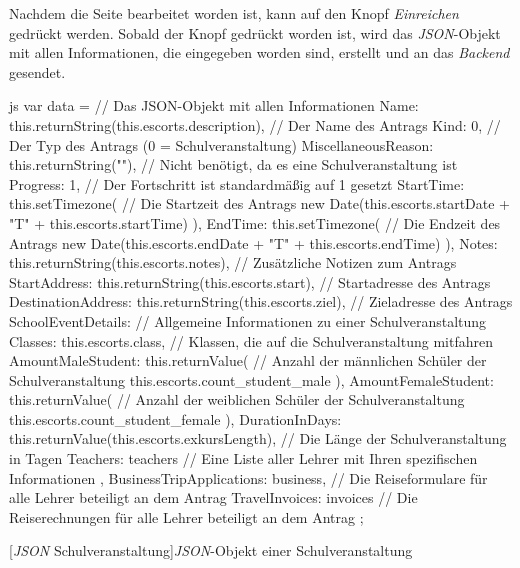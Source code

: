 \newpage
Nachdem die Seite bearbeitet worden ist, kann auf den Knopf \textit{Einreichen} gedrückt werden. Sobald der Knopf gedrückt worden ist, wird das \textit{JSON}-Objekt mit allen Informationen, die eingegeben worden sind, erstellt und an das \textit{Backend} gesendet.
\begin{code}{js}
var data = {		// Das JSON-Objekt mit allen Informationen
	Name: this.returnString(this.escorts.description),	// Der Name des Antrags
	Kind: 0,	// Der Typ des Antrags (0 = Schulveranstaltung)
	MiscellaneousReason: this.returnString(""),			// Nicht benötigt, da es eine Schulveranstaltung ist
	Progress: 1,	// Der Fortschritt ist standardmäßig auf 1 gesetzt
	StartTime: this.setTimezone(	// Die Startzeit des Antrags
	new Date(this.escorts.startDate + "T" + this.escorts.startTime)
	),
	EndTime: this.setTimezone(	// Die Endzeit des Antrags
	new Date(this.escorts.endDate + "T" + this.escorts.endTime)
	),
	Notes: this.returnString(this.escorts.notes),	// Zusätzliche Notizen zum Antrags
	StartAddress: this.returnString(this.escorts.start),	// Startadresse des Antrags
	DestinationAddress: this.returnString(this.escorts.ziel), // Zieladresse des Antrags
	SchoolEventDetails: {	// Allgemeine Informationen zu einer Schulveranstaltung
		Classes: this.escorts.class,	// Klassen, die auf die Schulveranstaltung mitfahren
		AmountMaleStudent: this.returnValue(	// Anzahl der männlichen Schüler der Schulveranstaltung
		this.escorts.count_student_male
		),
		AmountFemaleStudent: this.returnValue(	// Anzahl der weiblichen Schüler der Schulveranstaltung
		this.escorts.count_student_female
		),
		DurationInDays: this.returnValue(this.escorts.exkursLength),	// Die Länge der Schulveranstaltung in Tagen
		Teachers: teachers	// Eine Liste aller Lehrer mit Ihren spezifischen Informationen
	},
	BusinessTripApplications: business,	// Die Reiseformulare für alle Lehrer beteiligt an dem Antrag
	TravelInvoices: invoices	// Die Reiserechnungen für alle Lehrer beteiligt an dem Antrag
};
\end{code}
[\textit{JSON} Schulveranstaltung]{\textit{JSON}-Objekt einer Schulveranstaltung}~\\
\newpage
